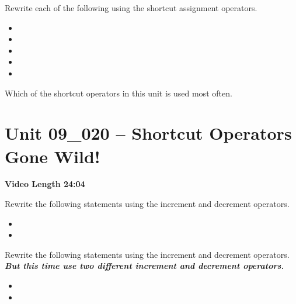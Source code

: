 \documentclass[letterpaper,12pt]{exam}
\newcommand{\unit}{Unit 09}
\begin{document}
\begin{questions}
\begin{samepage}
    \question Rewrite each of the following using the shortcut assignment operators.
      \begin{itemize}
        \item {}
        \vspace{5mm}
        \item {}
        \vspace{5mm}
        \item {}
        \vspace{5mm}
        \item {}
        \vspace{5mm}
        \item {}
        \vspace{5mm}
       \end{itemize}
\end{samepage}

\begin{samepage}
    \question Which of the shortcut operators in this unit is used most often.
    \vspace{5mm}
\end{samepage}


\section*{\unit\_020 -- Shortcut Operators Gone Wild!} 
\par{\selectfont\textbf{Video Length 24:04}}

\begin{samepage}
    \question Rewrite the following statements using the increment and decrement operators.
      \begin{itemize}
        \item {}
        \vspace{5mm}
        \item {}
        \vspace{5mm}
       \end{itemize}
\end{samepage}

\begin{samepage}
    \question Rewrite the following statements using the increment and decrement operators. \textbf{\emph{But this time use two different increment and decrement operators.}}
      \begin{itemize}
        \item {}
        \vspace{5mm}
        \item {}
        \vspace{5mm}
       \end{itemize}
\end{samepage}


\end{questions}
\end{document}
